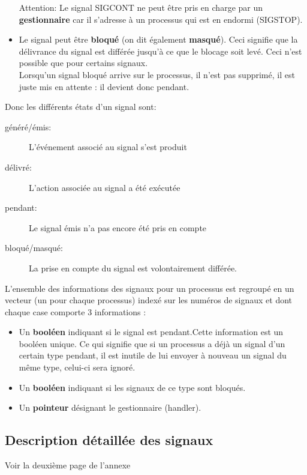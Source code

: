 \documentclass[10pt,french,A4]{article}
\theoremstyle{plain}
\begin{document}
\begin{itemize}
Attention: Le signal SIGCONT ne peut être pris en charge par un \textbf{gestionnaire} car il s'adresse à un processus qui est en endormi (SIGSTOP).
\item
  Le signal peut être \textbf{bloqué} (on dit également \textbf{masqué}). Ceci signifie
  que la délivrance du signal est différée jusqu'à ce que le blocage
  soit levé. Ceci n'est possible que pour certains signaux. \\ Lorsqu'un signal bloqué arrive sur le processus, il n'est
  pas supprimé, il est juste mis en attente : il devient donc pendant.
\end{itemize}
\begin{definition}
    Donc les différents états d'un signal sont:
    \begin{description}
        \item[généré/émis:] L'événement associé au signal s'est produit
        \item[délivré:] L'action associée au signal a été exécutée
         \item[pendant:]  Le signal émis n'a pas encore été pris en compte
        \item[bloqué/masqué:] La prise en compte du signal est volontairement différée.
    \end{description}
\end{definition}

L'ensemble des informations des signaux pour un processus est regroupé en un vecteur (un pour chaque processus) indexé sur les numéros de signaux et dont chaque case
comporte 3 informations :

\begin{itemize}
\item
  Un \textbf{booléen} indiquant si le signal est pendant.Cette
  information est un booléen unique. Ce qui signifie que si un processus
  a déjà un signal d'un certain type pendant, il est inutile de lui
  envoyer à nouveau un signal du même type, celui-ci sera ignoré.
\item
  Un\textbf{ booléen} indiquant si les signaux de ce type sont bloqués.
\item
  Un \textbf{pointeur} désignant le gestionnaire (handler).
\end{itemize}

\subsection{Description détaillée des signaux}
\hypertarget{liste-signaux}{ Voir la deuxième  page de l'annexe}
\end{document}
